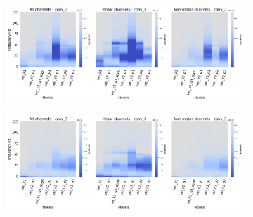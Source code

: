 \begin{figure}[!htpb]
\centering
\RawFloats
\begin{subfigure}[b]{\textwidth}
   \includegraphics[width=1\linewidth]{img/ch4/vel-conv-3-layer-grads}
   \caption{}
\end{subfigure}\label{fig:vel-conv3-layer-grads}

\begin{subfigure}[b]{\textwidth}
   \includegraphics[width=1\linewidth]{img/ch4/vel-conv-3-layer-grads-shifted}
   \caption{}
\end{subfigure}\label{fig:vel-conv3-layer-grads-shifted}
\caption[]{}
\end{figure}\label{fig:vel-shifted-vs-non-shifted-grads}

